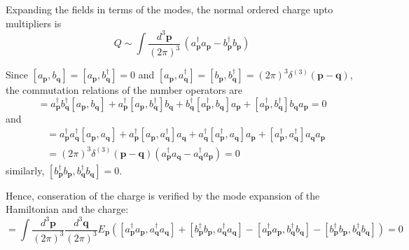\documentclass[a4paper,11pt]{article}
\begin{document}
Expanding the fields in terms of the modes, the normal ordered charge upto multipliers is
\begin{equation}
    Q \sim \int \frac{d^3\mathbf{p}}{(2\pi)^3}\, \left(a_{\mathbf{p}}^\dagger a_{\mathbf{p}} - b_{\mathbf{p}}^\dagger b_{\mathbf{p}}\right)
\end{equation}

Since $[a_{\mathbf{p}}, b_{\mathbf{q}}]=[a_{\mathbf{p}}, b_{\mathbf{q}}^\dagger]=0$ and $[a_{\mathbf{p}}, a_{\mathbf{q}}^\dagger] = [b_{\mathbf{p}}, b_{\mathbf{q}}^\dagger] = (2\pi)^3\delta^{(3)}(\mathbf{p}-\mathbf{q})$, the commutation relations of the number operators are
\begin{equation}
    [a^\dagger_{\mathbf{p}} a_{\mathbf{p}}, b_{\mathbf{q}}^\dagger b_{\mathbf{q}}] = a_{\mathbf{p}}^\dagger b_{\mathbf{q}}^\dagger [a_{\mathbf{p}}, b_{\mathbf{q}}] + a_{\mathbf{p}}^\dagger [a_{\mathbf{p}}, b_{\mathbf{q}}^\dagger] b_{\mathbf{q}} + b_{\mathbf{q}}^\dagger [a_{\mathbf{p}}^\dagger, b_{\mathbf{q}}] a_{\mathbf{p}} + [a_{\mathbf{p}}^\dagger, b_{\mathbf{q}}^\dagger] b_{\mathbf{q}} a_{\mathbf{p}} = 0
\end{equation}
and
\begin{align}
    [a^\dagger_{\mathbf{p}} a_{\mathbf{p}}, a_{\mathbf{q}}^\dagger a_{\mathbf{q}}] &= a_{\mathbf{p}}^\dagger a_{\mathbf{q}}^\dagger [a_{\mathbf{p}}, a_{\mathbf{q}}] + a_{\mathbf{p}}^\dagger [a_{\mathbf{p}}, a_{\mathbf{q}}^\dagger] a_{\mathbf{q}} + a_{\mathbf{q}}^\dagger [a_{\mathbf{p}}^\dagger, a_{\mathbf{q}}] a_{\mathbf{p}} + [a_{\mathbf{p}}^\dagger, a_{\mathbf{q}}^\dagger] a_{\mathbf{q}} a_{\mathbf{p}} \\
    &= (2\pi)^3\delta^{(3)}(\mathbf{p}-\mathbf{q})\left(a_{\mathbf{p}}^\dagger a_{\mathbf{q}} - a_{\mathbf{q}}^\dagger a_{\mathbf{p}}\right) = 0
\end{align}
similarly, $[b^\dagger_{\mathbf{p}} b_{\mathbf{p}}, b_{\mathbf{q}}^\dagger b_{\mathbf{q}}] = 0$.


Hence, conseration of the charge is verified by the mode expansion of the Hamiltonian and the charge:
\begin{equation}
    [H, Q] = \int \frac{d^3\mathbf{p}}{(2\pi)^3}\frac{d^3\mathbf{q}}{(2\pi)^3} E_{\mathbf{p}}\left([a_{\mathbf{p}}^\dagger a_{\mathbf{p}}, a_{\mathbf{q}}^\dagger a_{\mathbf{q}}] + [b_{\mathbf{p}}^\dagger b_{\mathbf{p}}, a_{\mathbf{q}}^\dagger a_{\mathbf{q}}] - [a_{\mathbf{p}}^\dagger a_{\mathbf{p}}, b_{\mathbf{q}}^\dagger b_{\mathbf{q}}] - [b_{\mathbf{p}}^\dagger b_{\mathbf{p}}, b_{\mathbf{q}}^\dagger b_{\mathbf{q}}]\right) = 0
\end{equation}
\end{document}
